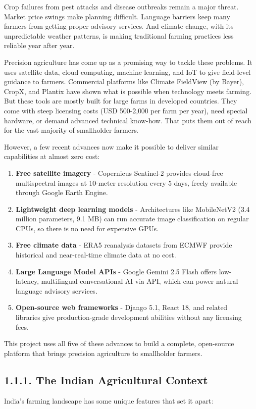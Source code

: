 \documentclass[12pt, a4paper]{report}
\begin{document}
Crop failures from pest attacks and disease outbreaks remain a major threat. Market price swings make planning difficult. Language barriers keep many farmers from getting proper advisory services. And climate change, with its unpredictable weather patterns, is making traditional farming practices less reliable year after year.

Precision agriculture has come up as a promising way to tackle these problems. It uses satellite data, cloud computing, machine learning, and IoT to give field-level guidance to farmers. Commercial platforms like Climate FieldView (by Bayer), CropX, and Plantix have shown what is possible when technology meets farming. But these tools are mostly built for large farms in developed countries. They come with steep licensing costs (USD 500-2,000 per farm per year), need special hardware, or demand advanced technical know-how. That puts them out of reach for the vast majority of smallholder farmers.

However, a few recent advances now make it possible to deliver similar capabilities at almost zero cost:

\begin{enumerate}[leftmargin=*]
  \item \textbf{Free satellite imagery} - Copernicus Sentinel-2 provides cloud-free multispectral images at 10-meter resolution every 5 days, freely available through Google Earth Engine.
  \item \textbf{Lightweight deep learning models} - Architectures like MobileNetV2 (3.4 million parameters, 9.1 MB) can run accurate image classification on regular CPUs, so there is no need for expensive GPUs.
  \item \textbf{Free climate data} - ERA5 reanalysis datasets from ECMWF provide historical and near-real-time climate data at no cost.
  \item \textbf{Large Language Model APIs} - Google Gemini 2.5 Flash offers low-latency, multilingual conversational AI via API, which can power natural language advisory services.
  \item \textbf{Open-source web frameworks} - Django 5.1, React 18, and related libraries give production-grade development abilities without any licensing fees.
\end{enumerate}
This project uses all five of these advances to build a complete, open-source platform that brings precision agriculture to smallholder farmers.

\subsection{1.1.1. The Indian Agricultural Context}
India's farming landscape has some unique features that set it apart:
\end{document}
